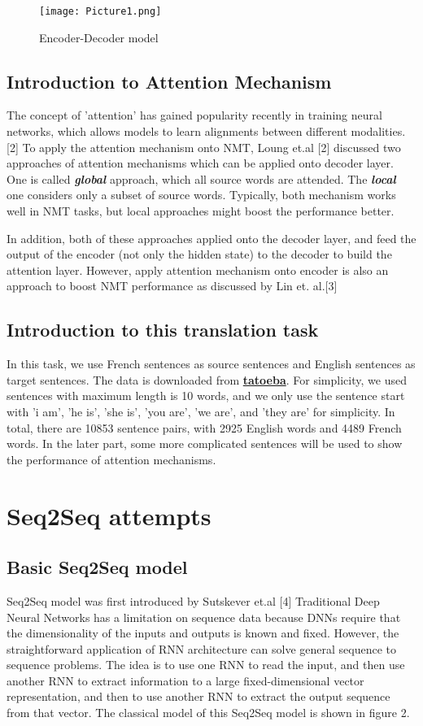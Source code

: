 \documentclass{article}
\begin{document}
\begin{figure}[h]
  \centering
  \texttt{[image: Picture1.png]}
  \caption{Encoder-Decoder model}
\end{figure}


\subsection{Introduction to Attention Mechanism}
The concept of 'attention' has gained popularity recently in training neural networks, which allows models to learn alignments between different modalities.[2] To apply the attention mechanism onto NMT, Loung et.al [2] discussed two approaches of attention mechanisms which can be applied onto decoder layer. One is 
called \textit{\textbf{global}} approach, which all source words are attended. The \textit{\textbf{local}} one considers only a subset of source words. Typically, both mechanism works well in NMT tasks, but local approaches might boost the performance better.

In addition, both of these approaches applied onto the decoder layer, and feed the output of the encoder (not only the hidden state) to the decoder to build the attention layer. However, apply attention mechanism onto encoder is also an approach to boost NMT performance as discussed by Lin et. al.[3] 

\subsection{Introduction to this translation task}
In this task, we use French sentences as source sentences and English sentences as target sentences. The data is downloaded from \href{https://tatoeba.org/eng/}{\textbf{tatoeba}}. For simplicity, we used sentences with maximum length is 10 words, and we only use the sentence start with 'i am', 'he is', 'she is', 'you are', 'we are', and 'they are' for simplicity. In total, there are 10853 sentence pairs, with 2925 English words and 4489 French words. In the later part, some more complicated sentences will be used to show the performance of attention mechanisms.


\section{Seq2Seq attempts}
\subsection{Basic Seq2Seq model}
Seq2Seq model was first introduced by Sutskever et.al [4]
Traditional Deep Neural Networks has a limitation on sequence data because DNNs require that the dimensionality of the inputs and outputs is known and fixed. However, the straightforward application of RNN architecture can solve general sequence to sequence problems. The idea is to use one RNN to read the input, and then use another RNN to extract information to a large fixed-dimensional vector representation, and then to use another RNN to extract the output sequence from that vector. The classical model of this Seq2Seq model is shown in figure 2.
\end{document}
